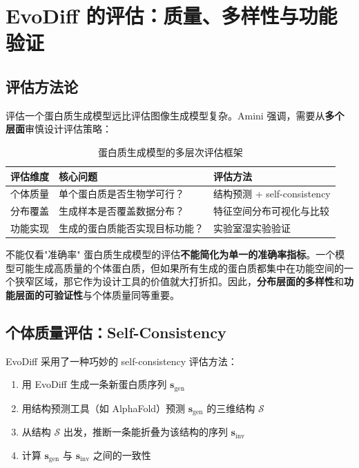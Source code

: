 \documentclass[a4paper]{article}
\begin{document}
\section{EvoDiff 的评估：质量、多样性与功能验证}

\subsection{评估方法论}

评估一个蛋白质生成模型远比评估图像生成模型复杂。Amini 强调，需要从\textbf{多个层面}审慎设计评估策略：

\begin{table}[H]
\centering
\caption{蛋白质生成模型的多层次评估框架}
\begin{tabular}{@{}lll@{}}
\toprule
\textbf{评估维度} & \textbf{核心问题} & \textbf{评估方法} \\
\midrule
个体质量 & 单个蛋白质是否生物学可行？ & 结构预测 + self-consistency \\
分布覆盖 & 生成样本是否覆盖数据分布？ & 特征空间分布可视化与比较 \\
功能实现 & 生成的蛋白质能否实现目标功能？ & 实验室湿实验验证 \\
\bottomrule
\end{tabular}
\end{table}

\begin{warningbox}{不能仅看"准确率"}
蛋白质生成模型的评估\textbf{不能简化为单一的准确率指标}。一个模型可能生成高质量的个体蛋白质，但如果所有生成的蛋白质都集中在功能空间的一个狭窄区域，那它作为设计工具的价值就大打折扣。因此，\textbf{分布层面的多样性}和\textbf{功能层面的可验证性}与个体质量同等重要。
\end{warningbox}

\subsection{个体质量评估：Self-Consistency}

EvoDiff 采用了一种巧妙的 self-consistency 评估方法：

\begin{enumerate}
    \item 用 EvoDiff 生成一条新蛋白质序列 $\mathbf{s}_{\text{gen}}$
    \item 用结构预测工具（如 AlphaFold）预测 $\mathbf{s}_{\text{gen}}$ 的三维结构 $\mathcal{S}$
    \item 从结构 $\mathcal{S}$ 出发，推断一条能折叠为该结构的序列 $\mathbf{s}_{\text{inv}}$
    \item 计算 $\mathbf{s}_{\text{gen}}$ 与 $\mathbf{s}_{\text{inv}}$ 之间的一致性
\end{enumerate}
\end{document}
